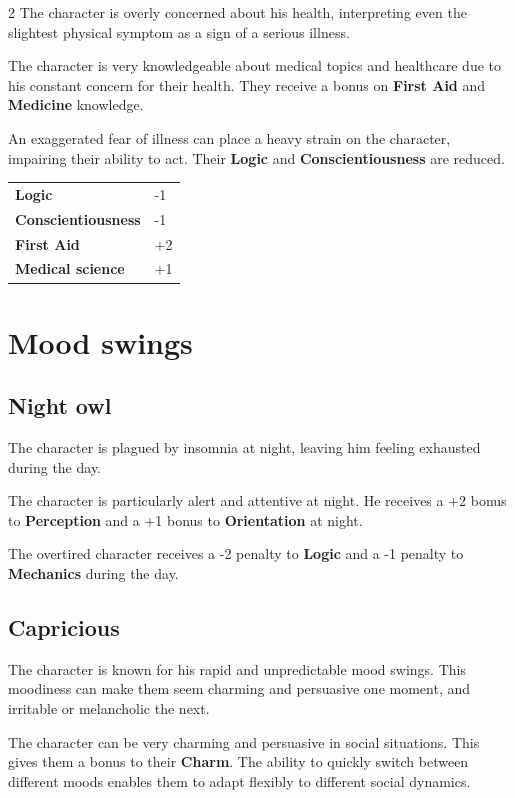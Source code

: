 \begin{multicols}{2}
    The character is overly concerned about his health, interpreting even the slightest physical symptom as a sign of a serious illness.

    The character is very knowledgeable about medical topics and healthcare due to his constant concern for their health. They receive a bonus on \textbf{First Aid} and \textbf{Medicine} knowledge.

    An exaggerated fear of illness can place a heavy strain on the character, impairing their ability to act. Their \textbf{Logic} and \textbf{Conscientiousness} are reduced.

    \begin{tabular}{@{}ll@{}}
        \textbf{Logic} & -1\\
        \textbf{Conscientiousness} & -1\\
        \textbf{First Aid} & +2\\
        \textbf{Medical science} & +1\\
    \end{tabular}

    \section{Mood swings}

    \subsection*{Night owl}

    The character is plagued by insomnia at night, leaving him feeling exhausted during the day.

    The character is particularly alert and attentive at night. He receives a +2 bonus to \textbf{Perception} and a +1 bonus to \textbf{Orientation} at night.

    The overtired character receives a -2 penalty to \textbf{Logic} and a -1 penalty to \textbf{Mechanics} during the day.


    \subsection*{Capricious}

    The character is known for his rapid and unpredictable mood swings. This moodiness can make them seem charming and persuasive one moment, and irritable or melancholic the next.

    The character can be very charming and persuasive in social situations. This gives them a bonus to their \textbf{Charm}. The ability to quickly switch between different moods enables them to adapt flexibly to different social dynamics.


\end{multicols}
